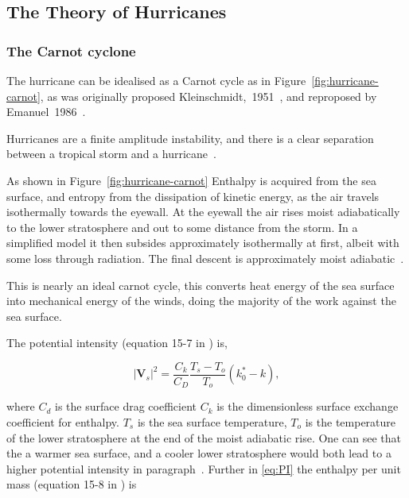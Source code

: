 
\subsection{The Theory of Hurricanes}
\label{sec:hurr-theory}
\subsubsection{The Carnot cyclone}
\label{sec:carnot}

The hurricane can be idealised as a Carnot cycle as in Figure~\ref{fig:hurricane-carnot},
as was originally proposed Kleinschmidt,~1951~\cite{kleinschmidt1951grundlagen},
and reproposed by Emanuel~1986~\cite{emanuel1986air, emanuel1987dependence, lilly1985steady,}.


Hurricanes are a finite amplitude instability, and there is a
clear separation between a tropical storm and a hurricane~\cite{emanuel2005divine}.

As shown in Figure~\ref{fig:hurricane-carnot} Enthalpy is acquired from the sea surface,
and entropy from the dissipation of kinetic energy,
 as the air travels isothermally towards the eyewall.
 At the eyewall the air rises moist adiabatically
 to the lower stratosphere and out to some distance from the storm.
 In a simplified model it then subsides
 approximately isothermally at first, albeit with some loss through radiation.
 The final descent is approximately moist adiabatic~\cite{emanuel2018progress}.

This is nearly an ideal carnot cycle, this converts heat energy of the sea surface into
mechanical energy of the winds, doing the majority of the work against the sea surface.

The potential intensity (equation 15-7 in \cite{emanuel2018progress}) is,

\begin{equation}
\left|\mathbf{V}_{s}\right|^{2}=\frac{C_{k}}{C_{D}} \frac{T_{s}-T_{o}}{T_{o}}\left(k_{0}^{*}-k\right),
\tag{PI}
\label{eq:PI}
\end{equation}

where $C_d$ is the surface drag coefficient $C_k$ is the dimensionless
surface exchange coefficient for enthalpy.
$T_s$ is the sea surface temperature, $T_o$ is the temperature of the
lower stratosphere at the end of the moist adiabatic rise.
One can see that the a warmer sea surface, and a cooler lower stratosphere
would both lead to a higher potential intensity in paragraph~\cite{emanuel1991theory, emanuel2018progress}.
Further in \ref{eq:PI} the enthalpy per unit mass (equation 15-8 in \cite{emanuel2018progress}) is


